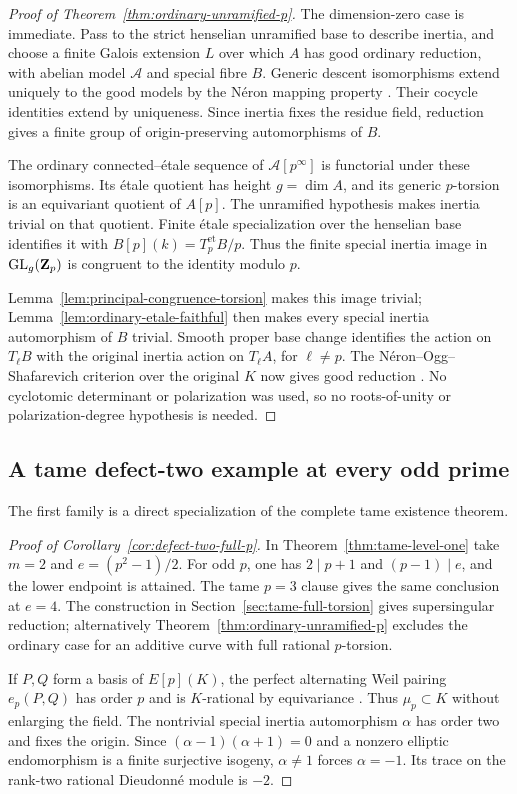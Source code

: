 \begin{proof}[Proof of Theorem~\ref{thm:ordinary-unramified-p}]
The dimension-zero case is immediate. Pass to the strict henselian unramified base to describe inertia, and choose a finite Galois extension $L$ over which $A$ has good ordinary reduction, with abelian model $\mathcal A$ and special fibre $B$. Generic descent isomorphisms extend uniquely to the good models by the N\'eron mapping property \citep[Theorem~17.1 and Remark~17.2, p.~70]{Milne2008AV}. Their cocycle identities extend by uniqueness. Since inertia fixes the residue field, reduction gives a finite group of origin-preserving automorphisms of $B$.

The ordinary connected--\'etale sequence of $\mathcal A[p^\infty]$ is functorial under these isomorphisms. Its \'etale quotient has height $g=\dim A$, and its generic $p$-torsion is an equivariant quotient of $A[p]$. The unramified hypothesis makes inertia trivial on that quotient. Finite \'etale specialization over the henselian base identifies it with $B[p](k)=T_p^{\mathrm{et}}B/p$. Thus the finite special inertia image in $\operatorname{GL}_g(\mathbf Z_p)$ is congruent to the identity modulo $p$.

Lemma~\ref{lem:principal-congruence-torsion} makes this image trivial; Lemma~\ref{lem:ordinary-etale-faithful} then makes every special inertia automorphism of $B$ trivial. Smooth proper base change identifies the action on $T_\ell B$ with the original inertia action on $T_\ell A$, for $\ell\ne p$. The N\'eron--Ogg--Shafarevich criterion over the original $K$ now gives good reduction \citep[Theorem~1, p.~493]{SerreTate1968}. No cyclotomic determinant or polarization was used, so no roots-of-unity or polarization-degree hypothesis is needed.
\end{proof}

\subsection{A tame defect-two example at every odd prime}
The first family is a direct specialization of the complete tame existence theorem.

\begin{proof}[Proof of Corollary~\ref{cor:defect-two-full-p}]
In Theorem~\ref{thm:tame-level-one} take $m=2$ and $e=(p^2-1)/2$. For odd $p$, one has $2\mid p+1$ and $(p-1)\mid e$, and the lower endpoint is attained. The tame $p=3$ clause gives the same conclusion at $e=4$. The construction in Section~\ref{sec:tame-full-torsion} gives supersingular reduction; alternatively Theorem~\ref{thm:ordinary-unramified-p} excludes the ordinary case for an additive curve with full rational $p$-torsion.

If $P,Q$ form a basis of $E[p](K)$, the perfect alternating Weil pairing $e_p(P,Q)$ has order $p$ and is $K$-rational by equivariance \citep[Section~I.13, p.~57]{Milne2008AV}. Thus $\mu_p\subset K$ without enlarging the field. The nontrivial special inertia automorphism $\alpha$ has order two and fixes the origin. Since $(\alpha-1)(\alpha+1)=0$ and a nonzero elliptic endomorphism is a finite surjective isogeny, $\alpha\ne1$ forces $\alpha=-1$. Its trace on the rank-two rational Dieudonn\'e module is $-2$.
\end{proof}

